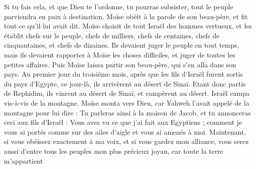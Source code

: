 \begin{multicols}{2}
Si tu fais cela, et que Dieu te l’ordonne, tu pourras subsister, tout le peuple parviendra en paix à destination.
Moïse obéit à la parole de son beau-père, et fit tout ce qu'il lui avait dit.
Moïse choisit de tout Israël des hommes vertueux, et les établit chefs sur le peuple, chefs de milliers, chefs de centaines, chefs de cinquantaines, et chefs de dizaines.
Ils devaient juger le peuple en tout temps, mais ils devaient rapporter à Moïse les choses difficiles, et juger de toutes les petites affaires.
Puis Moïse laissa partir son beau-père, qui s'en alla dans son pays.
\VerseOne{}Au premier jour du troisième mois, après que les fils d'Israël furent sortis du pays d'Egypte, ce jour-là, ils arrivèrent au désert de Sinaï.
Etant donc partis de Rephidim, ils vinrent au désert de Sinaï, et campèrent au désert. Israël campa vis-à-vis de la montagne.
Moïse monta vers Dieu, car Yahweh l'avait appelé de la montagne pour lui dire : Tu parleras ainsi à la maison de Jacob, et tu annonceras ceci aux fils d'Israël :
Vous avez vu ce que j'ai fait aux Egyptiens ; comment je vous ai portés comme sur des ailes d'aigle et vous ai amenés à moi.
Maintenant, si vous obéissez exactement à ma voix, et si vous gardez mon alliance, vous serez aussi d'entre tous les peuples mon plus précieux joyau, car toute la terre m'appartient
\end{multicols}

